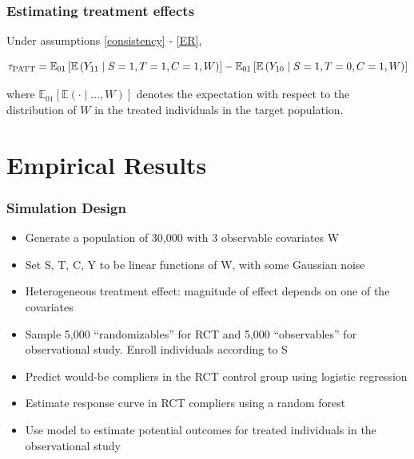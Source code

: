 \documentclass{beamer}
\newcommand{\ex}{\mathbb{E}} %
\newcommand{\tikzmark}[1]{\tikz[overlay,remember picture] \node (#1) {};}
\begin{document}
\begin{frame}
\frametitle{Estimating treatment effects}
\begin{theorem}\label{thm1}
\fontsize{9pt}{7.2}\selectfont
Under assumptions \eqref{consistency} - \eqref{ER},

$$\tau_{\text{PATT}} = \ex_{01}\left[  \tikzmark{exp1}{\ex\left(Y_{11} \mid S=1, T=1, C=1, W\right)}\right]
-\ex_{01}\left[  \tikzmark{exp2}{ \ex\left(Y_{10} \mid S=1,T=0, C=1, W\right) }\right] $$

where $\ex_{01}\left[\ex(\cdot \mid\dots, W)\right]$ denotes the expectation with respect to the distribution of $W$ in the treated individuals in the target population.  
\end{theorem}
\end{frame}


\section[Simulation]{Empirical Results}


\begin{frame}
\frametitle{Simulation Design}
\begin{itemize}
\item Generate a population of 30,000 with 3 observable covariates W
\item Set S, T, C, Y to be linear functions of W, with some Gaussian noise
\item Heterogeneous treatment effect: magnitude of effect depends on one of the covariates
\item Sample 5,000 ``randomizables'' for RCT and 5,000 ``observables'' for observational study. Enroll individuals according to S
\item Predict would-be compliers in the RCT control group using logistic regression
\item Estimate response curve in RCT compliers using a random forest
\item Use model to estimate potential outcomes for treated individuals in the observational study
\end{itemize}
\end{frame}
\end{document}

